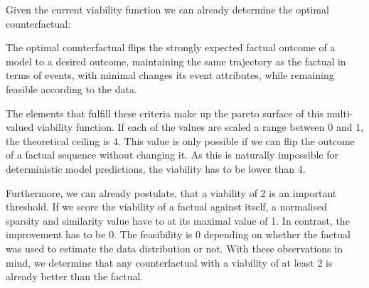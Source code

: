 \documentclass[./../../paper.tex]{subfiles}
\begin{document}
Given the current viability function we can already determine the optimal counterfactual:
\begin{displayquote}
    The optimal counterfactual flips the strongly expected factual outcome of a model to a desired outcome, maintaining the same trajectory as the factual in terms of events, with minimal changes its event attributes, while remaining feasible according to the data.
\end{displayquote}

\noindent The elements that fulfill these criteria make up the pareto surface of this multi-valued viability function. If each of the values are scaled a range between 0 and 1, the theoretical ceiling is 4. This value is only possible if we can flip the outcome of a factual sequence without changing it. As this is naturally impossible for deterministic model predictions, the viability has to be lower than 4. 

Furthermore, we can already postulate, that a viability of 2 is an important threshold. If we score the viability of a factual against itself, a normalised sparsity and similarity value have to at its maximal value of 1. In contrast, the improvement has to be 0. The feasibility is 0 depending on whether the factual was used to estimate the data distribution or not. With these observations in mind, we determine that any counterfactual with a viability of at least 2 is already better than the factual. 
\end{document}
